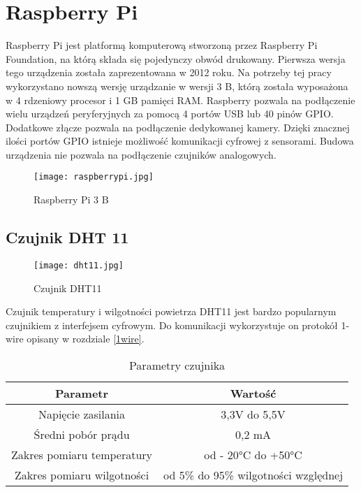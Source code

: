 \section{Raspberry Pi} \label{raspi}
Raspberry Pi jest platformą komputerową stworzoną przez Raspberry Pi Foundation, na którą składa się pojedynczy obwód drukowany. Pierwsza wersja tego urządzenia została zaprezentowana w 2012 roku. Na potrzeby tej pracy wykorzystano nowszą wersję urządzanie w wersji 3 B, którą została wyposażona w 4 rdzeniowy procesor i 1 GB pamięci RAM. Raspberry pozwala na podłączenie wielu urządzeń peryferyjnych za pomocą 4 portów USB lub 40 pinów GPIO. Dodatkowe złącze pozwala na podłączenie dedykowanej kamery. Dzięki znacznej ilości portów GPIO istnieje możliwość komunikacji cyfrowej z sensorami. Budowa urządzenia nie pozwala na podłączenie czujników analogowych.
\begin{figure}[H]
	\centering
	\texttt{[image: raspberrypi.jpg]}
	\caption{Raspberry Pi 3 B}
	\label{fig:raspberrypi}
\end{figure}

\subsection{Czujnik DHT 11}
\begin{figure}[H]
	\centering
	\texttt{[image: dht11.jpg]}
	\caption{Czujnik DHT11}
	\label{fig:dht11}
\end{figure}
Czujnik temperatury i wilgotności powietrza DHT11 jest bardzo popularnym czujnikiem z interfejsem cyfrowym. Do komunikacji wykorzystuje on protokół 1-wire opisany w rozdziale \ref{1wire}.
\begin{table}[H]
	\centering
	\caption{Parametry czujnika}
	\begin{tabular}{|c|c|}
  		\hline 
  		\bfseries Parametr & \bfseries Wartość \\
  		\hline
  		Napięcie zasilania & 3,3V do 5,5V\\
  		\hline
  		Średni pobór prądu & 0,2 mA\\
  		\hline 
  		Zakres pomiaru temperatury & od - 20\si{\degree}C do +50\si{\degree}C\\
  		\hline 
  		Zakres pomiaru wilgotności & od 5\% do 95\% wilgotności względnej\\
  		\hline 
  	\end{tabular}
\end{table}

